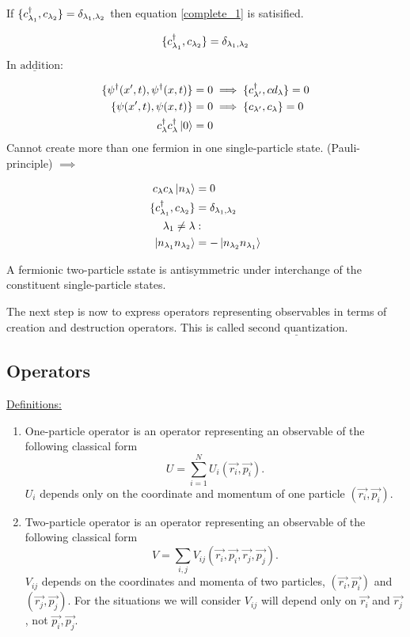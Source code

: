 If $\{c^{\dagger}_{\lambda_1}, c_{\lambda_2}\}= \delta_{\lambda_1, \lambda_2}$ then equation \eqref{complete_1} is satisified.

\begin{equation}
	\{c^{\dagger}_{\lambda_1}, c_{\lambda_2}\}= \delta_{\lambda_1, \lambda_2}
\end{equation}

\noindent $\underline{\text{In addition:}}$

\begin{align}
	\{ \psi^\dagger(x',t), \psi^\dagger(x,t) \} &= 0 \implies \{c^{\dagger}_{\lambda'}, cd_\lambda\} =0\\
	\{ \psi(x',t), \psi(x,t) \} &= 0 \implies \{c_{\lambda'}, c_\lambda\} =0\\
	c^{\dagger}_\lambda c^{\dagger}_\lambda \ket{0}&=0
\end{align}
Cannot create more than one fermion in one single-particle state. (Pauli-principle) $\implies$

\begin{align*}
	c_\lambda c_\lambda \ket{n_\lambda}&=0\\
	\{c^{\dagger}_{\lambda_1},c_{\lambda_2}\}&= \delta_{\lambda_1, \lambda_2}\\
	\lambda_1 \neq \lambda &:\\
	\ket{n_{\lambda_1} n_{\lambda_2}} &= - \ket{n_{\lambda_2} n_{\lambda_1}}
\end{align*}

\noindent A fermionic two-particle sstate is antisymmetric under interchange of the constituent single-particle states.

\begin{tcolorbox}
	The next step is now to express operators representing observables in terms of creation and destruction operators. This is called $\underline{\text{second quantization}}$.
\end{tcolorbox}

\subsection{Operators}

\noindent \uline{Definitions:}

\begin{enumerate}
	\item
		One-particle operator is an operator representing an observable of the following classical form
		\begin{equation}
			U= \sum_{i=1}^{N} U_i(\vec{r_i}, \vec{p_i}).
		\end{equation}
		$U_i$ depends only on the coordinate and momentum of one particle $(\vec{r_i}, \vec{p_i})$.
	\item
		Two-particle operator is an operator representing an observable of the following classical form
		\begin{equation}
			V= \sum_{i,j } V_{ij} (\vec{r_i}, \vec{p_i},\vec{r_j}, \vec{p_j}).
		\end{equation}
		$V_{ij}$ depends on the coordinates and momenta of two particles, $(\vec{r_i}, \vec{p_i})$ and $(\vec{r_j}, \vec{p_j})$. For the situations we will consider $V_{ij}$ will depend only on $\vec{r_i}$ and $\vec{r_j}$, not $\vec{p_i}, \vec{p_j}$.
\end{enumerate}

